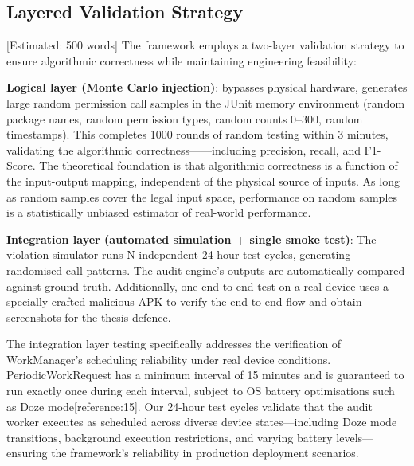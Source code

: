 \subsection{Layered Validation Strategy} [Estimated: 500 words]
The framework employs a two-layer validation strategy to ensure algorithmic correctness while maintaining engineering feasibility:

\textbf{Logical layer (Monte Carlo injection)}: bypasses physical hardware, generates large random permission call samples in the JUnit memory environment (random package names, random permission types, random counts 0--300, random timestamps). This completes 1000 rounds of random testing within 3 minutes, validating the algorithmic correctness——including precision, recall, and F1-Score. The theoretical foundation is that algorithmic correctness is a function of the input-output mapping, independent of the physical source of inputs. As long as random samples cover the legal input space, performance on random samples is a statistically unbiased estimator of real-world performance.

\textbf{Integration layer (automated simulation + single smoke test)}: The violation simulator runs N independent 24-hour test cycles, generating randomised call patterns. The audit engine's outputs are automatically compared against ground truth. Additionally, one end-to-end test on a real device uses a specially crafted malicious APK to verify the end-to-end flow and obtain screenshots for the thesis defence.

The integration layer testing specifically addresses the verification of WorkManager's scheduling reliability under real device conditions. PeriodicWorkRequest has a minimum interval of 15 minutes and is guaranteed to run exactly once during each interval, subject to OS battery optimisations such as Doze mode[reference:15]. Our 24-hour test cycles validate that the audit worker executes as scheduled across diverse device states—including Doze mode transitions, background execution restrictions, and varying battery levels—ensuring the framework's reliability in production deployment scenarios.
